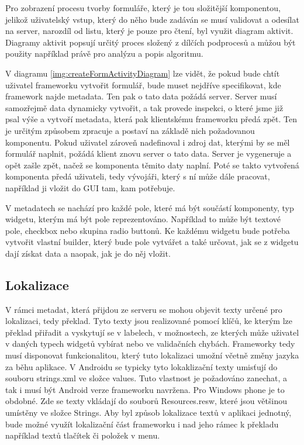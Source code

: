 Pro zobrazení procesu tvorby formuláře, který je tou složitější komponentou, jelikož uživatelský vstup, který do něho bude zadáván se musí validovat a odesílat na server, narozdíl od listu, který je pouze pro čtení, byl využit diagram aktivit. Diagramy aktivit popsují určitý proces složený z dílčích podprocesů a můžou být použity například právě pro analýzu a popis algoritmu. 

V diagramu \ref{img:createFormActivityDiagram} lze vidět, že pokud bude chtít uživatel frameworku vytvořit formulář, bude muset nejdříve specifikovat, kde framework najde metadata. Ten pak o tato data požádá server. Server musí samozřejmě data dynamicky vytvořit, a tak provede inspekci, o které jsme již psal výše a vytvoří metadata, která pak klientskému frameworku předá zpět. Ten je určitým způsobem zpracuje a postaví na základě nich požadovanou komponentu. Pokud uživatel zároveň nadefinoval i zdroj dat, kterými by se měl formulář naplnit, požádá klient znovu server o tato data. Server je vygeneruje a opět zašle zpět, načež se komponenta těmito daty naplní. Poté se takto vytvořená komponenta předá uživateli, tedy vývojáři, který s ní může dále pracovat, například ji vložit do GUI tam, kam potřebuje.

V metadatech se nachází pro každé pole, které má být součástí komponenty, typ widgetu, kterým má být pole reprezentováno. Například to může být textové pole, checkbox nebo skupina radio buttonů. Ke každému widgetu bude potřeba vytvořit vlastní builder, který bude pole vytvářet a také určovat, jak se z widgetu dají získat data a naopak, jak je do něj vložit. 

\subsection{Lokalizace}
V rámci metadat, která přijdou ze serveru se mohou objevit texty určené pro lokalizaci, tedy překlad. Tyto texty jsou realizované pomocí klíčů, ke kterým lze překlad přiřadit a vyskytují se v labelech, v možnostech, ze kterých může uživatel v daných typech widgetů vybírat nebo ve validačních chybách. Frameworky tedy musí disponovat funkcionalitou, který tuto lokalizaci umožní včetně změny jazyka za běhu aplikace. V Androidu se typicky tyto lokaklizační texty umisťují do souboru strings.xml ve složce values. Tuto vlastnost je požadováno zanechat, a tak i musí být Android verze frameworku navržena. Pro Windows phone je to obdobné. Zde se texty vkládají do souborů Resources.resw, které jsou většinou umístěny ve složce Strings. Aby byl způsob lokalizace textů v aplikaci jednotný, bude možné využít lokalizační část frameworku i nad jeho rámec k překladu například textů tlačítek či položek v menu.

